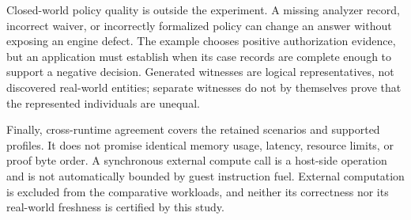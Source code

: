 Closed-world policy quality is outside the experiment. A missing analyzer
record, incorrect waiver, or incorrectly formalized policy can change an answer
without exposing an engine defect. The example chooses positive authorization
evidence, but an application must establish when its case records are complete
enough to support a negative decision. Generated witnesses are logical
representatives, not discovered real-world entities; separate witnesses do not
by themselves prove that the represented individuals are unequal.

Finally, cross-runtime agreement covers the retained scenarios and supported
profiles. It does not promise identical memory usage, latency, resource limits,
or proof byte order. A synchronous external compute call is a host-side
operation and is not automatically bounded by guest instruction fuel.
External computation is excluded from the comparative workloads, and neither
its correctness nor its real-world freshness is certified by this study.
